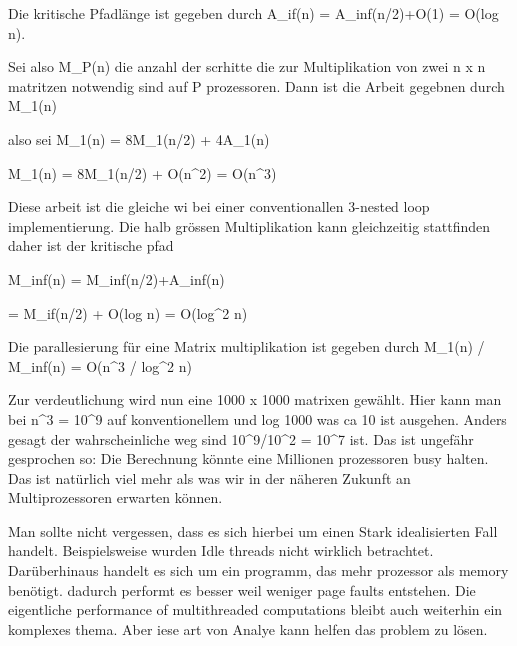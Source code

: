 Die kritische Pfadlänge ist gegeben durch A_if(n) = A_inf(n/2)+O(1) = O(log n).


Sei also M_P(n) die anzahl der scrhitte die zur Multiplikation von zwei n x n matritzen notwendig sind auf P prozessoren. Dann ist die Arbeit gegebnen durch M_1(n) 

also sei
M_1(n) = 8M_1(n/2) + 4A_1(n)

M_1(n) = 8M_1(n/2) + O(n^2)
= O(n^3)


Diese arbeit ist die gleiche wi bei einer conventionallen 3-nested loop implementierung. Die halb grössen Multiplikation kann gleichzeitig stattfinden daher ist der kritische pfad

M_inf(n) = M_inf(n/2)+A_inf(n)

= M_if(n/2) + O(log n)
= O(log^2 n)

Die parallesierung für eine Matrix multiplikation ist gegeben durch M_1(n) / M_inf(n) = O(n^3 / log^2 n)


Zur verdeutlichung wird nun eine 1000 x 1000 matrixen gewählt. Hier kann man bei 
n^3 = 10^9 
auf konventionellem und log 1000 was ca 10 ist ausgehen. Anders gesagt der wahrscheinliche weg sind 
10^9/10^2 = 10^7 
ist. Das ist ungefähr gesprochen so: Die Berechnung könnte eine Millionen prozessoren busy halten. Das ist natürlich viel mehr als was wir in der näheren Zukunft an Multiprozessoren erwarten können. 


Man sollte nicht vergessen, dass es sich hierbei um einen Stark idealisierten Fall handelt. Beispielsweise wurden Idle threads nicht wirklich betrachtet. Darüberhinaus handelt es sich um ein programm, das mehr prozessor als memory benötigt. dadurch performt es besser weil weniger page faults entstehen. Die eigentliche performance of multithreaded computations bleibt auch weiterhin ein komplexes thema. Aber iese art von Analye kann helfen das problem zu lösen.